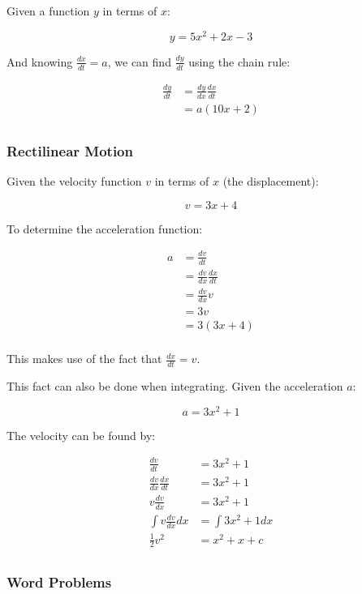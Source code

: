 \documentclass[a4paper,11pt]{report}
\begin{document}
Given a function $y$ in terms of $x$:

$$
y = 5x^2 + 2x - 3
$$

And knowing $\frac{dx}{dt} = a$, we can find $\frac{dy}{dt}$ using the chain
rule:

$$
\begin{aligned}
\frac{dy}{dt} & = \frac{dy}{dx} \frac{dx}{dt} \\
& = a(10x + 2) \\
\end{aligned}
$$

\subsubsection{Rectilinear Motion}

Given the velocity function $v$ in terms of $x$ (the displacement):

$$
v = 3x + 4
$$

To determine the acceleration function:

$$
\begin{aligned}
a & = \frac{dv}{dt} \\
& = \frac{dv}{dx} \frac{dx}{dt} \\
& = \frac{dv}{dx} v \\
& = 3v \\
& = 3(3x + 4) \\
\end{aligned}
$$

This makes use of the fact that $\frac{dx}{dt} = v$.

This fact can also be done when integrating. Given the acceleration $a$:

$$
a = 3x^2 + 1
$$

The velocity can be found by:

$$
\begin{aligned}
\frac{dv}{dt} & = 3x^2 + 1 \\
\frac{dv}{dx} \frac{dx}{dt} & = 3x^2 + 1 \\
v \frac{dv}{dx} & = 3x^2 + 1 \\
\int v \frac{dv}{dx} dx & = \int 3x^2 + 1 dx \\
\frac{1}{2} v^2 & = x^2 + x + c \\
\end{aligned}
$$

\subsubsection{Word Problems}
\end{document}
